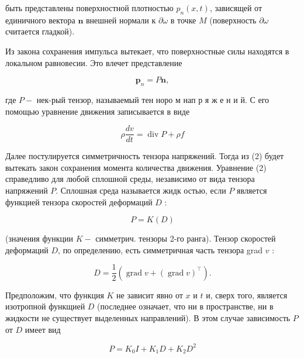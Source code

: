 \documentclass[10pt]{article}
\begin{document}
быть представлены поверхностной плотностью $p_{n}(x, t)$, зависящей от единичного вектора $\boldsymbol{n}$ внешней нормали к $\partial \omega$ в точке $M$ (поверхность $\partial \omega$ считается гладкой).



Из закона сохранения импульса вытекает, что поверхностные силы находятся в локальном равновесии. Это влечет представление



\[

\boldsymbol{p}_{n}=P \boldsymbol{n},

\]



где $P-$ нек-рый тензор, называемый тен норо м нап р я ж е н и й. С его помощью уравнение движения записывается в виде



\[

\rho \frac{d v}{d t}=\operatorname{div} P+\rho f

\]



Далее постулируется симметричность тензора напряжений. Тогда из (2) будет вытекать закон сохранения момента количества движения. Уравнение (2) справедливо для любой сплошной среды, независимо от вида тензора напряжений $P$. Сплошная среда называется жидк остью, если $P$ является функцией тензора скоростей деформаций $D$ :



\[

P=K(D)

\]



(значения функции $K-$ симметрич. тензоры 2-го ранга). Тензор скоростей деформаций $D$, по определению, есть симметричная часть тензора grad $v$ :



\[

D=\frac{1}{2}\left(\operatorname{grad} v+(\operatorname{grad} v)^{\top}\right) .

\]



Предположим, что функция $K$ не зависит явно от $x$ и $t$ и, сверх того, является изотропной функщией $D$ (последнее означает, что ни в пространстве, ни в жидкости не существует выделенных направлений). В этом случае зависимость $P$ от $D$ имеет вид



\[

P=K_{0} I+K_{1} D+K_{2} D^{2}

\]
\end{document}
